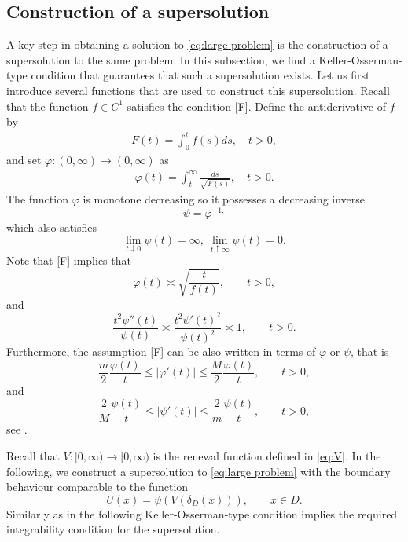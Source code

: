 \documentclass[12pt,a4paper,onecolumn]{amsart}
\theoremstyle{definition}
\newcommand{\1}{\mathbf 1}
\newcommand{\de}{\delta_D}
\numberwithin{equation}{section}
\begin{document}
\subsection{Construction of a supersolution}\label{ss:construction large}
A key step in obtaining a solution to \eqref{eq:large problem} is the construction of a supersolution to the same problem. In this subsection, we find a Keller-Osserman-type condition that guarantees that such a supersolution exists. Let us first introduce several functions that are used to construct this supersolution. Recall that the function $f\in C^{1}$ satisfies the condition \ref{F}. Define the antiderivative of $f$ by
\begin{align*}
	F(t)=\int_0^tf(s)ds,\quad t>0,
\end{align*}
and set $\varphi:(0,\infty)\to (0,\infty)$ as
\begin{align*}
	\varphi(t)=\int_t^\infty \frac{ds}{\sqrt{F(s)}},\quad t>0.
\end{align*}
The function $\varphi$ is monotone decreasing so it possesses a decreasing inverse
\begin{equation}\label{eq:psi_definition}
\psi=\varphi^{-1,}
\end{equation}
which also satisfies  
\[
\lim\limits_{t\downarrow 0}\psi(t)=\infty,\ \lim\limits_{t\uparrow\infty}\psi(t)=0.
\]
Note that \ref{F} implies that
\begin{equation}\label{eq:f2}
    \varphi(t)\asymp \sqrt{\frac{t}{f(t)}},\qquad t>0,
\end{equation}
and
\begin{equation}\label{eq:psi1}
	\frac{t^2\psi''(t)}{\psi(t)}\asymp \frac{t^2\psi'(t)^2}{\psi(t)^2}\asymp 1,\qquad t>0.
\end{equation}
Furthermore, the assumption \ref{F} can be also written in terms of $\varphi$ or $\psi$, that is 
\begin{equation}\label{eq:varphi1}
\frac m 2 \frac{\varphi(t)}{t}\leq |\varphi'(t)|\leq \frac M 2 \frac{\varphi(t)}{t},\qquad t>0,
\end{equation}
and
\begin{equation}\label{eq:psi2}
\frac 2 M \frac{\psi(t)}{t}\leq |\psi'(t)|\leq \frac 2 m\frac{\psi(t)}{t},\qquad  t>0,
\end{equation}
see \cite[Remark 1.1]{Aba17}.

Recall that $V:[0,\infty)\to [0,\infty)$ is the renewal function defined in \eqref{eq:V}. In the following, we construct a supersolution to \eqref{eq:large problem} with the boundary behaviour comparable to the function 
\begin{equation}\label{eq:U}
U(x)=\psi(V(\de(x))),\qquad x\in D.    
\end{equation}
Similarly as in \cite[Lemma 3.1]{semilinear_cvw} the following Keller-Osserman-type condition implies the required integrability condition for the supersolution.
\end{document}

